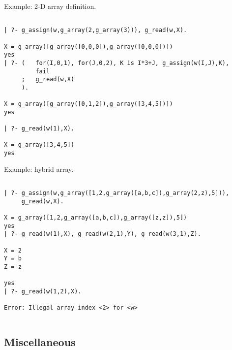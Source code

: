 Example: 2-D array definition.


\begin{verbatim}

| ?- g_assign(w,g_array(2,g_array(3))), g_read(w,X).

X = g_array([g_array([0,0,0]),g_array([0,0,0])])
yes
| ?- (   for(I,0,1), for(J,0,2), K is I*3+J, g_assign(w(I,J),K), 
         fail
     ;   g_read(w,X)
     ).

X = g_array([g_array([0,1,2]),g_array([3,4,5])])
yes

| ?- g_read(w(1),X).

X = g_array([3,4,5])
yes

\end{verbatim}


Example: hybrid array.


\begin{verbatim}

| ?- g_assign(w,g_array([1,2,g_array([a,b,c]),g_array(2,z),5])), 
     g_read(w,X).

X = g_array([1,2,g_array([a,b,c]),g_array([z,z]),5])
yes
| ?- g_read(w(1),X), g_read(w(2,1),Y), g_read(w(3,1),Z).

X = 2
Y = b
Z = z

yes
| ?- g_read(w(1,2),X).

Error: Illegal array index <2> for <w>


\end{verbatim}






\subsection{Miscellaneous}

